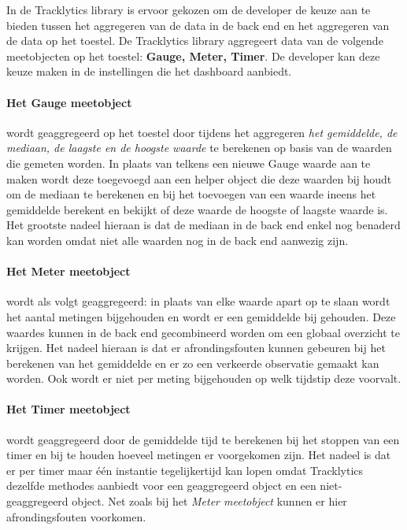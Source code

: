 In de Tracklytics library is ervoor gekozen om de developer de keuze aan te bieden tussen het aggregeren van de data in de back end en het aggregeren van de data op het toestel. De Tracklytics library aggregeert data van de volgende meetobjecten op het toestel: \textbf{Gauge, Meter, Timer}. De developer kan deze keuze maken in de instellingen die het dashboard aanbiedt. \\

\paragraph{Het Gauge meetobject} wordt geaggregeerd op het toestel door tijdens het aggregeren \textit{het gemiddelde, de mediaan, de laagste en de hoogste waarde} te berekenen op basis van de waarden die gemeten worden. In plaats van telkens een nieuwe Gauge waarde aan te maken wordt deze toegevoegd aan een helper object die deze waarden bij houdt om de mediaan te berekenen en bij het toevoegen van een waarde ineens het gemiddelde berekent en bekijkt of deze waarde de hoogste of laagste waarde is. Het grootste nadeel hieraan is dat de mediaan in de back end enkel nog benaderd kan worden omdat niet alle waarden nog in de back end aanwezig zijn. \\

\paragraph{Het Meter meetobject} wordt als volgt geaggregeerd: in plaats van elke waarde apart op te slaan wordt het aantal metingen bijgehouden en wordt er een gemiddelde bij gehouden. Deze waardes kunnen in de back end gecombineerd worden om een globaal overzicht te krijgen. Het nadeel hieraan is dat er afrondingsfouten kunnen gebeuren bij het berekenen van het gemiddelde en er zo een verkeerde observatie gemaakt kan worden. Ook wordt er niet per meting bijgehouden op welk tijdstip deze voorvalt. \\

\paragraph{Het Timer meetobject} wordt geaggregeerd door de gemiddelde tijd te berekenen bij het stoppen van een timer en bij te houden hoeveel metingen er voorgekomen zijn. Het nadeel is dat er per timer maar \'e\'en instantie tegelijkertijd kan lopen omdat Tracklytics dezelfde methodes aanbiedt voor een geaggregeerd object en een niet-geaggregeerd object. Net zoals bij het \textit{Meter meetobject} kunnen er hier afrondingsfouten voorkomen. \\



